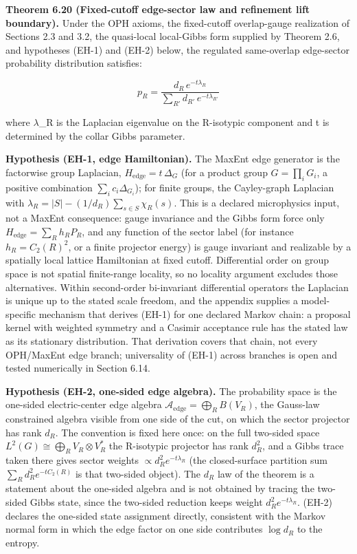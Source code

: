 \textbf{Theorem 6.20 (Fixed-cutoff edge-sector law and refinement lift boundary).} Under the OPH
axioms, the fixed-cutoff overlap-gauge realization of Sections 2.3 and 3.2, the quasi-local
local-Gibbs form supplied by Theorem 2.6, and hypotheses (EH-1) and (EH-2) below, the regulated
same-overlap edge-sector probability distribution satisfies:

\[
p_R = \frac{d_R \, e^{-t \lambda_R}}{\sum_{R'} d_{R'} \, e^{-t \lambda_{R'}}}
\]

where \ensuremath{\lambda}\_R is the Laplacian eigenvalue on the R-isotypic component and t is determined by the collar Gibbs parameter.

\textbf{Hypothesis (EH-1, edge Hamiltonian).} The MaxEnt edge generator is the factorwise group
Laplacian, \(H_{\mathrm{edge}} = t\,\Delta_G\) (for a product group \(G=\prod_i G_i\), a positive
combination \(\sum_i c_i \Delta_{G_i}\)); for finite groups, the Cayley-graph Laplacian with
\(\lambda_R = |S| - (1/d_R)\sum_{s\in S}\chi_R(s)\). This is a declared microphysics input, not a
MaxEnt consequence: gauge invariance and the Gibbs form force only \(H_{\mathrm{edge}} =
\sum_R h_R P_R\), and any function of the sector label (for instance \(h_R = C_2(R)^2\), or a
finite projector energy) is gauge invariant and realizable by a spatially local lattice
Hamiltonian at fixed cutoff. Differential order on group space is not spatial finite-range
locality, so no locality argument excludes those alternatives. Within second-order bi-invariant
differential operators the Laplacian is unique up to the stated scale freedom, and the appendix
supplies a model-specific mechanism that derives (EH-1) for one declared Markov chain: a proposal
kernel with weighted symmetry and a Casimir acceptance rule has the stated law as its stationary
distribution. That derivation covers that chain, not every OPH/MaxEnt edge branch; universality
of (EH-1) across branches is open and tested numerically in Section 6.14.

\textbf{Hypothesis (EH-2, one-sided edge algebra).} The probability space is the one-sided
electric-center edge algebra \(\mathcal A_{\mathrm{edge}} = \bigoplus_R B(V_R)\), the Gauss-law
constrained algebra visible from one side of the cut, on which the sector projector has rank
\(d_R\). The convention is fixed here once: on the full two-sided space \(L^2(G) \cong
\bigoplus_R V_R \otimes V_R^*\) the R-isotypic projector has rank \(d_R^2\), and a Gibbs trace
taken there gives sector weights \(\propto d_R^2 e^{-t\lambda_R}\) (the closed-surface partition
sum \(\sum_R d_R^2 e^{-tC_2(R)}\) is that two-sided object). The \(d_R\) law of the theorem is a
statement about the one-sided algebra and is not obtained by tracing the two-sided Gibbs state,
since the two-sided reduction keeps weight \(d_R^2 e^{-t\lambda_R}\). (EH-2) declares the one-sided
state assignment directly, consistent with the Markov normal form in which the edge factor on
one side contributes \(\log d_R\) to the entropy.

